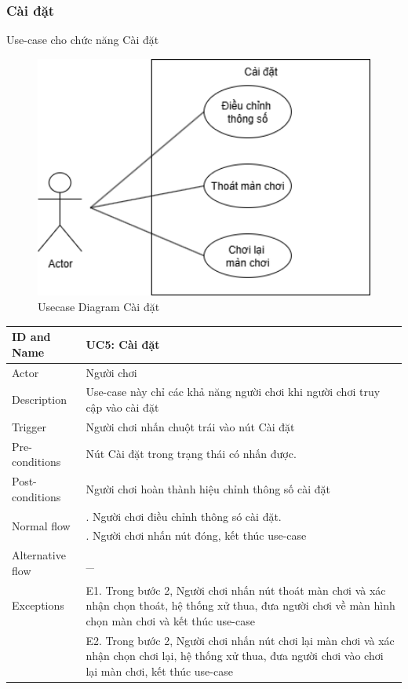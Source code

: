 \subsubsection{Cài đặt}
Use-case cho chức năng Cài đặt
\begin{figure}[H]
	\centering
	\includegraphics[width=14cm]{Images/SettingUCD.png}
	\vspace{0.5cm}
	\caption{Usecase Diagram Cài đặt}
\end{figure}
\begin{center}
	\begin{tabular}{|l|p{12cm}|}
		\hline
		ID and Name & UC5: Cài đặt \\
		\hline
		Actor  & Người chơi \\
		\hline
		Description  & Use-case này chỉ các khả năng người chơi khi người chơi truy cập vào cài đặt\\
		\hline
		Trigger  & Người chơi nhấn chuột trái vào nút Cài đặt\\
		\hline
		Pre-conditions & Nút Cài đặt trong trạng thái có nhấn được.\\
		\hline
		Post-conditions & Người chơi hoàn thành hiệu chỉnh thông số cài đặt\\
		\hline
		\multirow{2}{*}{Normal flow}      &\qquad 1. Người chơi điều chỉnh thông só cài đặt.\\
		&\qquad 2. Người chơi nhấn nút đóng, kết thúc use-case\\
		\hline
		Alternative flow  & \_\\
		\hline
		Exceptions  & \qquad E1. Trong bước 2, Người chơi nhấn nút thoát màn chơi và xác nhận chọn thoát, hệ thống xử thua, đưa người chơi về màn hình chọn màn chơi và kết thúc use-case\\
		&\qquad E2. Trong bước 2, Người chơi nhấn nút chơi lại màn chơi và xác nhận chọn chơi lại, hệ thống xử thua, đưa người chơi vào chơi lại màn chơi, kết thúc use-case\\
		\hline
	\end{tabular}
\end{center}
